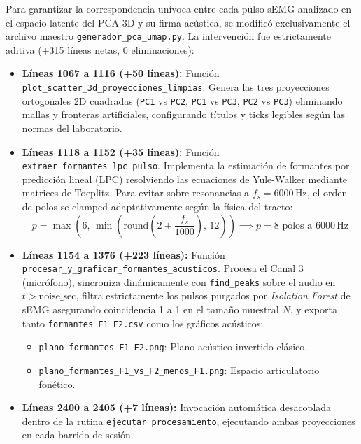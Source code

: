 \documentclass[11pt,a4paper]{article}
\begin{document}
Para garantizar la correspondencia unívoca entre cada pulso sEMG analizado en el espacio latente del PCA 3D y su firma acústica, se modificó exclusivamente el archivo maestro \texttt{generador\_pca\_umap.py}. La intervención fue estrictamente aditiva (+315 líneas netas, 0 eliminaciones):

\begin{itemize}
    \item \textbf{Líneas 1067 a 1116 (+50 líneas):} Función \texttt{plot\_scatter\_3d\_proyecciones\_limpias}. Genera las tres proyecciones ortogonales 2D cuadradas (\texttt{PC1} vs \texttt{PC2}, \texttt{PC1} vs \texttt{PC3}, \texttt{PC2} vs \texttt{PC3}) eliminando mallas y fronteras artificiales, configurando títulos y ticks legibles según las normas del laboratorio.
    \item \textbf{Líneas 1118 a 1152 (+35 líneas):} Función \texttt{extraer\_formantes\_lpc\_pulso}. Implementa la estimación de formantes por predicción lineal (LPC) resolviendo las ecuaciones de Yule-Walker mediante matrices de Toeplitz. Para evitar sobre-resonancias a $f_s = 6000\,\text{Hz}$, el orden de polos se clamped adaptativamente según la física del tracto:
    \begin{equation}
        p = \max\left(6, \, \min\left(\text{round}\left(2 + \frac{f_s}{1000}\right), \, 12\right)\right) \implies p = 8 \text{ polos a } 6000\,\text{Hz}
    \end{equation}
    \item \textbf{Líneas 1154 a 1376 (+223 líneas):} Función \texttt{procesar\_y\_graficar\_formantes\_acusticos}. Procesa el Canal 3 (micrófono), sincroniza dinámicamente con \texttt{find\_peaks} sobre el audio en $t > \text{noise\_sec}$, filtra estrictamente los pulsos purgados por \textit{Isolation Forest} de sEMG asegurando coincidencia 1 a 1 en el tamaño muestral $N$, y exporta tanto \texttt{formantes\_F1\_F2.csv} como los gráficos acústicos:
    \begin{itemize}
        \item \texttt{plano\_formantes\_F1\_F2.png}: Plano acústico invertido clásico.
        \item \texttt{plano\_formantes\_F1\_vs\_F2\_menos\_F1.png}: Espacio articulatorio fonético.
    \end{itemize}
    \item \textbf{Líneas 2400 a 2405 (+7 líneas):} Invocación automática desacoplada dentro de la rutina \texttt{ejecutar\_procesamiento}, ejecutando ambas proyecciones en cada barrido de sesión.
\end{itemize}
\end{document}
